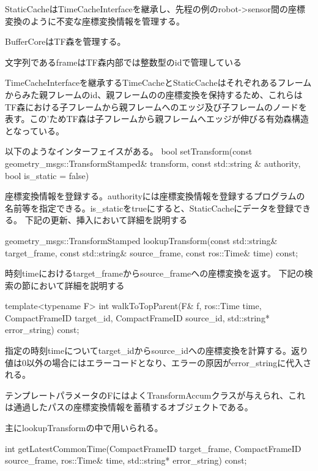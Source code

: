 \documentclass{jarticle}
\begin{document}
\begin{multicols}{2}




StaticCacheはTimeCacheInterfaceを継承し、先程の例のrobot->sensor間の座標変換のように不変な座標変換情報を管理する。


BufferCoreはTF森を管理する。

文字列であるframeはTF森内部では整数型のidで管理している

TimeCacheInterfaceを継承するTimeCacheとStaticCacheはそれぞれあるフレームからみた親フレームのid、親フレームのの座標変換を保持するため、これらはTF森における子フレームから親フレームへのエッジ及び子フレームのノードを表す。この’ためTF森は子フレームから親フレームへエッジが伸びる有効森構造となっている。


以下のようなインターフェイスがある。
bool setTransform(const geometry\_msgs::TransformStamped\& transform, const std::string \& authority, bool is\_static = false)

座標変換情報を登録する。authorityには座標変換情報を登録するプログラムの名前等を指定できる。is\_staticをtrueにすると、StaticCacheにデータを登録できる。
下記の更新、挿入において詳細を説明する

geometry\_msgs::TransformStamped lookupTransform(const std::string\& target\_frame, const std::string\& source\_frame, const ros::Time\& time) const;
		   
時刻timeにおけるtarget\_frameからsource\_frameへの座標変換を返す。
下記の検索の節において詳細を説明する


template<typename F> int walkToTopParent(F\& f, ros::Time time, CompactFrameID target\_id, CompactFrameID source\_id, std::string* error\_string) const;


指定の時刻timeについてtarget\_idからsource\_idへの座標変換を計算する。返り値は0以外の場合にはエラーコードとなり、エラーの原因がerror\_stringに代入される。

テンプレートパラメータのFにはよくTransformAccumクラスが与えられ、これは通過したパスの座標変換情報を蓄積するオブジェクトである。

主にlookupTransformの中で用いられる。

int getLatestCommonTime(CompactFrameID target\_frame, CompactFrameID source\_frame, ros::Time\& time, std::string* error\_string) const;


\end{multicols}
\end{document}
